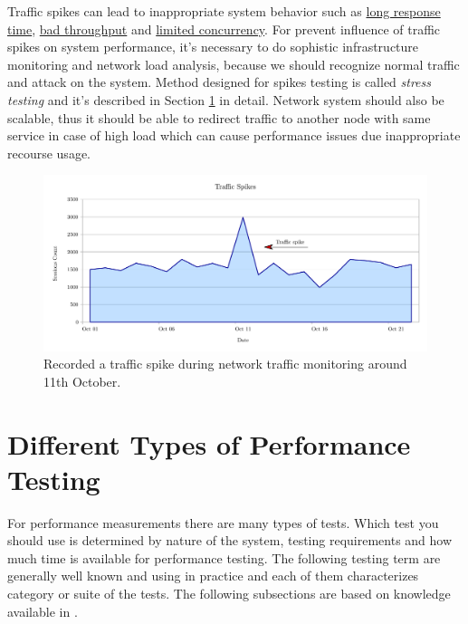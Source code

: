 Traffic spikes can lead to inappropriate system behavior such as \underline{long response time}, \underline{bad throughput} and \underline{limited concurrency}. For prevent influence of traffic spikes on system performance, it's  necessary to do sophistic infrastructure monitoring and network load analysis, because we should recognize normal traffic and attack on the system. Method designed for spikes testing is called \emph{stress testing} \cite{Manzor:APTB} and it's described in Section \ref{Different Types of Performance Testing} in detail. Network system should also be scalable, thus it should be able to redirect traffic to another node with same service in case of high load which can cause performance issues due inappropriate recourse usage.

\begin{figure}[H]
  \centering
  \includegraphics[width=15cm]{obrazky-figures/traffic-spikes.pdf}
  \caption{Recorded a traffic spike during network traffic monitoring around 11th October.}
  \label{fig:spikes}
\end{figure}

\section{Different Types of Performance Testing}
\label{Different Types of Performance Testing}

For performance measurements there are many types of tests. Which test you should use is determined by nature of the system, testing requirements and how much time is available for performance testing. The following testing term are generally well known and using in practice and each of them characterizes category or suite of the tests. The following subsections are based on knowledge available in \cite{TuPo:TESTS, BUCH:4TYPES, Molyneaux:TAoAPT}.

